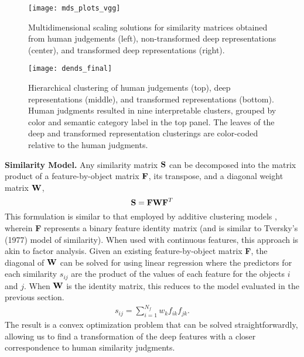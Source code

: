 \documentclass[10pt,letterpaper]{article}
\begin{document}
\begin{figure*}[!ht]
\begin{center}
\texttt{[image: mds\_plots\_vgg]}
\end{center}
\vspace{-5px}
\caption{Multidimensional scaling solutions for similarity matrices obtained from human judgements (left), non-transformed deep representations (center), and transformed deep representations (right).}
\label{mds-plots}
\end{figure*}


\begin{figure*}[!ht]
\begin{center}
\texttt{[image: dends\_final]}
\end{center}
\vspace{-5px}
\caption{Hierarchical clustering of human judgements (top), deep representations (middle), and transformed representations (bottom). Human judgments resulted in nine interpretable clusters, grouped by color and semantic category label in the top panel. The leaves of the deep and transformed representation clusterings are color-coded relative to the human judgments.}
\label{dend-plots}
\end{figure*}

\noindent \textbf{Similarity Model.} Any similarity matrix ${\bf S}$ can be decomposed into the matrix product of a feature-by-object matrix ${\bf F}$, its transpose, and a diagonal weight matrix ${\bf W}$,
\begin{equation}{\bf S} = {\bf F}{\bf W} {\bf F}^T
\end{equation}
This formulation is similar to that employed by additive clustering models \citep*{shepard1979additive}, wherein {\bf F} represents a binary feature identity matrix (and is similar to Tversky's (1977) model of similarity). When used with continuous features, this approach is akin to factor analysis. Given an existing feature-by-object matrix {\bf F}, the diagonal of ${\bf W}$ can be solved for using linear regression where the predictors for each similarity $s_{ij}$ are the product of the values of each feature for the objects $i$ and $j$. When ${\bf W}$ is the identity matrix, this reduces to the model evaluated in the previous section.
\begin{equation}
  \label{eq:u}
  \begin{gathered}
\displaystyle s_{ij} = \sum_{i=1}^{N_{f}} w_{k}f_{ik}f_{jk} .
 \end{gathered}
 \end{equation}
The result is a convex optimization problem that can be solved straightforwardly, allowing us to find a transformation of the deep features with a closer correspondence to human similarity judgments. \\
\end{document}

